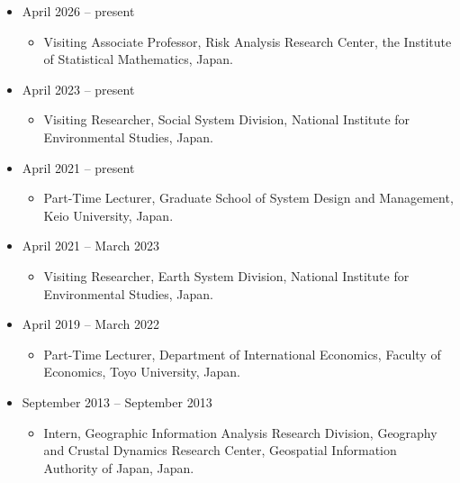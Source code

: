 \documentclass[
]{book}
\providecommand{\tightlist}{%
  \setlength{\itemsep}{0pt}\setlength{\parskip}{0pt}}
\begin{document}
\begin{itemize}
\tightlist
\item
  April 2026 -- present

  \begin{itemize}
  \tightlist
  \item
    Visiting Associate Professor,
    Risk Analysis Research Center, the Institute of Statistical Mathematics, Japan.
  \end{itemize}
\item
  April 2023 -- present

  \begin{itemize}
  \tightlist
  \item
    Visiting Researcher,
    Social System Division, National Institute for Environmental Studies, Japan.
  \end{itemize}
\item
  April 2021 -- present

  \begin{itemize}
  \tightlist
  \item
    Part-Time Lecturer,
    Graduate School of System Design and Management, Keio University, Japan.
  \end{itemize}
\item
  April 2021 -- March 2023

  \begin{itemize}
  \tightlist
  \item
    Visiting Researcher,
    Earth System Division, National Institute for Environmental Studies, Japan.
  \end{itemize}
\item
  April 2019 -- March 2022

  \begin{itemize}
  \tightlist
  \item
    Part-Time Lecturer,
    Department of International Economics, Faculty of Economics, Toyo University, Japan.
  \end{itemize}
\item
  September 2013 -- September 2013

  \begin{itemize}
  \tightlist
  \item
    Intern,
    Geographic Information Analysis Research Division, Geography and Crustal Dynamics Research Center, Geospatial Information Authority of Japan, Japan.
  \end{itemize}
\end{itemize}
\end{document}
